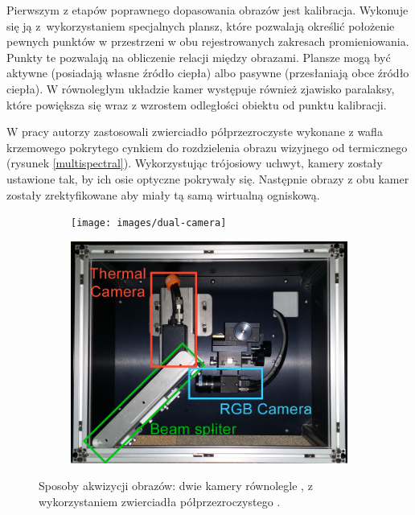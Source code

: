 Pierwszym z etapów poprawnego dopasowania obrazów jest kalibracja.
Wykonuje się ją z~wykorzystaniem specjalnych plansz, które pozwalają określić położenie pewnych punktów w przestrzeni w obu rejestrowanych zakresach promieniowania. 
Punkty te pozwalają na obliczenie relacji między obrazami. 
Plansze mogą być aktywne (posiadają własne źródło ciepła) albo pasywne (przesłaniają obce źródło ciepła). 
W równoległym układzie kamer występuje również zjawisko paralaksy, które powiększa się wraz z wzrostem odległości obiektu od punktu kalibracji. 

W pracy \cite{hwang2015multispectral} autorzy zastosowali zwierciadło półprzezroczyste wykonane z wafla krzemowego pokrytego cynkiem do rozdzielenia obrazu wizyjnego od termicznego (rysunek \ref{multispectral}). Wykorzystując trójosiowy uchwyt, kamery zostały ustawione tak, by ich osie optyczne pokrywały się. Następnie obrazy z obu kamer zostały zrektyfikowane aby miały tą samą wirtualną ogniskową.

\begin{figure}[h]
\centering
\begin{subfigure}{0.45\textwidth}
\centering
\texttt{[image: images/dual-camera]}
\subcaption{\label{dual_camera}}
\end{subfigure}
\begin{subfigure}{0.45\textwidth}
\centering
\includegraphics[width=1\textwidth]{images/multispectral}
\subcaption{\label{multispectral}}
\end{subfigure}
\caption{\label{fig:cameras_systems}Sposoby akwizycji obrazów: \protect{} dwie kamery równolegle \cite{lee2015robust}, \protect{} z wykorzystaniem zwierciadła półprzezroczystego \cite{hwang2015multispectral}.}
\end{figure}


